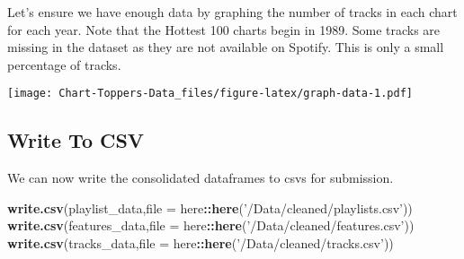 \documentclass[
]{article}
\newenvironment{Shaded}{\begin{snugshade}}{\end{snugshade}}
\newcommand{\DataTypeTok}[1]{\textcolor[rgb]{0.13,0.29,0.53}{#1}}
\newcommand{\KeywordTok}[1]{\textcolor[rgb]{0.13,0.29,0.53}{\textbf{#1}}}
\newcommand{\NormalTok}[1]{#1}
\newcommand{\OperatorTok}[1]{\textcolor[rgb]{0.81,0.36,0.00}{\textbf{#1}}}
\newcommand{\StringTok}[1]{\textcolor[rgb]{0.31,0.60,0.02}{#1}}
\begin{document}
Let's ensure we have enough data by graphing the number of tracks in
each chart for each year. Note that the Hottest 100 charts begin in
1989. Some tracks are missing in the dataset as they are not available
on Spotify. This is only a small percentage of tracks.

\begin{Shaded}
\end{Shaded}

\texttt{[image: Chart-Toppers-Data\_files/figure-latex/graph-data-1.pdf]}

\hypertarget{write-to-csv}{%
\subsection{Write To CSV}\label{write-to-csv}}

We can now write the consolidated dataframes to csvs for submission.

\begin{Shaded}
\begin{Highlighting}[]
\KeywordTok{write.csv}\NormalTok{(playlist_data,}\DataTypeTok{file =}\NormalTok{ here}\OperatorTok{::}\KeywordTok{here}\NormalTok{(}\StringTok{'/Data/cleaned/playlists.csv'}\NormalTok{))}
\KeywordTok{write.csv}\NormalTok{(features_data,}\DataTypeTok{file =}\NormalTok{ here}\OperatorTok{::}\KeywordTok{here}\NormalTok{(}\StringTok{'/Data/cleaned/features.csv'}\NormalTok{))}
\KeywordTok{write.csv}\NormalTok{(tracks_data,}\DataTypeTok{file =}\NormalTok{ here}\OperatorTok{::}\KeywordTok{here}\NormalTok{(}\StringTok{'/Data/cleaned/tracks.csv'}\NormalTok{))}
\end{Highlighting}
\end{Shaded}
\end{document}
